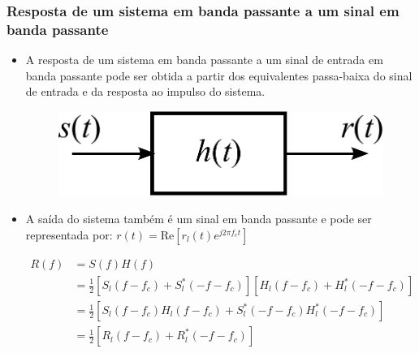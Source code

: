 \begin{frame}
	\frametitle{Resposta de um sistema em banda passante a um sinal em banda passante}

	\begin{itemize}
	  \item A resposta de um sistema em banda passante a um sinal de entrada em banda passante pode ser obtida a partir dos equivalentes passa-baixa do sinal de entrada e da resposta ao impulso do sistema.
	  \begin{figure}[t]
	  \begin{center}
	    \includegraphics[width=0.3\columnwidth]{figs/system}
	  \end{center}
	\end{figure}
	  \item A saída do sistema também é um sinal em banda passante e pode ser representada por: $r(t) = \mathrm{Re}[r_l(t)e^{j2\pi f_c t}]$
	 \begin{small}\begin{align*}
	      R(f) &= S(f)H(f) \\
	      &= \frac{1}{2}[S_l(f-f_c) + S_l^*(-f-f_c)][H_l(f-f_c) + H_l^*(-f-f_c)] \\
	      &= \frac{1}{2}[S_l(f-f_c)H_l(f-f_c) + S_l^*(-f-f_c)H_l^*(-f-f_c)] \\
	      &= \frac{1}{2}[R_l(f-f_c) + R_l^*(-f-f_c)]
	\end{align*}	            \end{small}
	\end{itemize}


\end{frame}

